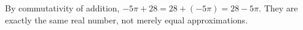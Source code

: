 By commutativity of addition, $-5\pi+28=28+(-5\pi)=28-5\pi$. They are exactly the same real number, not merely equal approximations.
